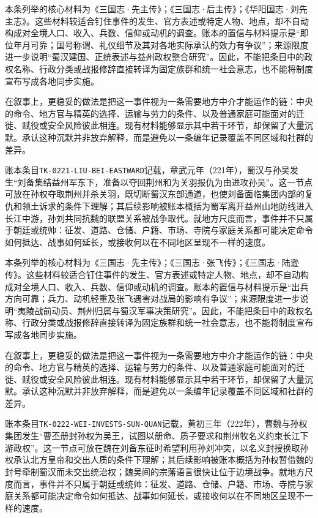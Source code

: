 本条列举的核心材料为《三国志·先主传》；《三国志·后主传》；《华阳国志·刘先主志》。这些材料较适合钉住事件的发生、官方表述或特定人物、地点，却不自动构成对全境人口、收入、兵数、信仰或动机的调查。账本的置信与材料提示是“即位年月可靠；国号称谓、礼仪细节及其对各地实际承认的效力有争议”；来源限度进一步说明“蜀汉建国、正统表述与益州政权整合研究”。因此，不能把条目中的政权名称、行政分类或战报修辞直接转译为固定族群和统一社会意志，也不能将制度宣布写成各地同步实施。

在叙事上，更稳妥的做法是把这一事件视为一条需要地方中介才能运作的链：中央的命令、地方官与精英的选择、运输与劳力的条件、以及普通家庭可能面对的迁徙、赋役或安全风险彼此相连。现有材料能够显示其中若干环节，却保留了大量沉默。承认这种沉默并非放弃解释，而是避免以一条编年记录覆盖不同区域和社群的差异。

账本条目\texttt{TK-0221-LIU-BEI-EASTWARD}记载，章武元年（221年），蜀汉与孙吴发生“刘备集结益州军东下，准备以夺回荆州和为关羽报仇为由进攻孙吴”。这一节点可放在孙权夺取荆州并杀关羽，既切断蜀汉东部通道，也使刘备面临集团内部的复仇和领土诉求的条件下理解；其后续影响被账本概括为蜀军离开益州山地防线进入长江中游，孙刘共同抗魏的联盟关系被战争取代。就地方尺度而言，事件并不只属于朝廷或统帅：征发、道路、仓储、户籍、市场、寺院与家庭关系都可能决定命令如何抵达、战事如何延长，或接收何以在不同地区呈现不一样的速度。

本条列举的核心材料为《三国志·先主传》；《三国志·张飞传》；《三国志·陆逊传》。这些材料较适合钉住事件的发生、官方表述或特定人物、地点，却不自动构成对全境人口、收入、兵数、信仰或动机的调查。账本的置信与材料提示是“出兵方向可靠；兵力、动机轻重及张飞遇害对战局的影响有争议”；来源限度进一步说明“夷陵战前动员、荆州归属与蜀汉军事决策研究”。因此，不能把条目中的政权名称、行政分类或战报修辞直接转译为固定族群和统一社会意志，也不能将制度宣布写成各地同步实施。

在叙事上，更稳妥的做法是把这一事件视为一条需要地方中介才能运作的链：中央的命令、地方官与精英的选择、运输与劳力的条件、以及普通家庭可能面对的迁徙、赋役或安全风险彼此相连。现有材料能够显示其中若干环节，却保留了大量沉默。承认这种沉默并非放弃解释，而是避免以一条编年记录覆盖不同区域和社群的差异。

账本条目\texttt{TK-0222-WEI-INVESTS-SUN-QUAN}记载，黄初三年（222年），曹魏与孙权集团发生“曹丕册封孙权为吴王，试图以册命、质子要求和荆州牧名义约束长江下游政权”。这一节点可放在魏在刘备东征时希望利用孙刘冲突，以名义封授换取孙权承认北方皇帝和交出人质的条件下理解；其后续影响被账本概括为孙权暂借魏的封号牵制蜀汉而未交出统治权；魏吴间的宗藩语言很快让位于边境战争。就地方尺度而言，事件并不只属于朝廷或统帅：征发、道路、仓储、户籍、市场、寺院与家庭关系都可能决定命令如何抵达、战事如何延长，或接收何以在不同地区呈现不一样的速度。

